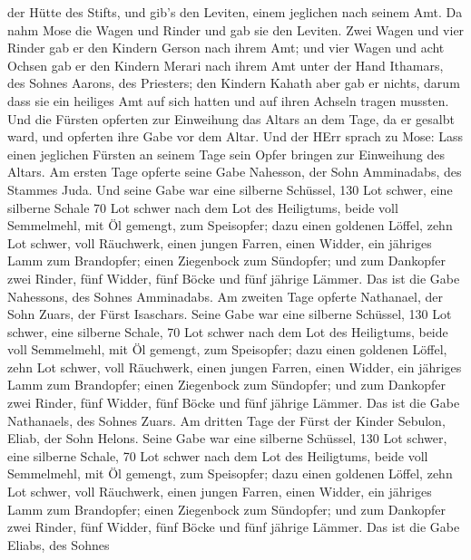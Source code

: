 der Hütte des Stifts, und gib's den Leviten, einem jeglichen nach seinem
Amt.  Da nahm Mose die Wagen und Rinder und gab sie den
Leviten.  Zwei Wagen und vier Rinder gab er den Kindern
Gerson nach ihrem Amt;  und vier Wagen und acht Ochsen gab
er den Kindern Merari nach ihrem Amt unter der Hand Ithamars, des Sohnes
Aarons, des Priesters;  den Kindern Kahath aber gab er
nichts, darum dass sie ein heiliges Amt auf sich hatten und auf ihren
Achseln tragen mussten.  Und die Fürsten opferten zur
Einweihung das Altars an dem Tage, da er gesalbt ward, und opferten ihre
Gabe vor dem Altar.  Und der HErr sprach zu Mose: Lass
einen jeglichen Fürsten an seinem Tage sein Opfer bringen zur Einweihung
des Altars.  Am ersten Tage opferte seine Gabe Nahesson,
der Sohn Amminadabs, des Stammes Juda.  Und seine Gabe war
eine silberne Schüssel, 130 Lot schwer, eine silberne Schale 70 Lot
schwer nach dem Lot des Heiligtums, beide voll Semmelmehl, mit Öl
gemengt, zum Speisopfer;  dazu einen goldenen Löffel, zehn
Lot schwer, voll Räuchwerk,  einen jungen Farren, einen
Widder, ein jähriges Lamm zum Brandopfer;  einen Ziegenbock
zum Sündopfer;  und zum Dankopfer zwei Rinder, fünf Widder,
fünf Böcke und fünf jährige Lämmer. Das ist die Gabe Nahessons, des
Sohnes Amminadabs.  Am zweiten Tage opferte Nathanael, der
Sohn Zuars, der Fürst Isaschars.  Seine Gabe war eine
silberne Schüssel, 130 Lot schwer, eine silberne Schale, 70 Lot schwer
nach dem Lot des Heiligtums, beide voll Semmelmehl, mit Öl gemengt, zum
Speisopfer;  dazu einen goldenen Löffel, zehn Lot schwer,
voll Räuchwerk,  einen jungen Farren, einen Widder, ein
jähriges Lamm zum Brandopfer;  einen Ziegenbock zum
Sündopfer;  und zum Dankopfer zwei Rinder, fünf Widder,
fünf Böcke und fünf jährige Lämmer. Das ist die Gabe Nathanaels, des
Sohnes Zuars.  Am dritten Tage der Fürst der Kinder
Sebulon, Eliab, der Sohn Helons.  Seine Gabe war eine
silberne Schüssel, 130 Lot schwer, eine silberne Schale, 70 Lot schwer
nach dem Lot des Heiligtums, beide voll Semmelmehl, mit Öl gemengt, zum
Speisopfer;  dazu einen goldenen Löffel, zehn Lot schwer,
voll Räuchwerk,  einen jungen Farren, einen Widder, ein
jähriges Lamm zum Brandopfer;  einen Ziegenbock zum
Sündopfer;  und zum Dankopfer zwei Rinder, fünf Widder,
fünf Böcke und fünf jährige Lämmer. Das ist die Gabe Eliabs, des Sohnes
